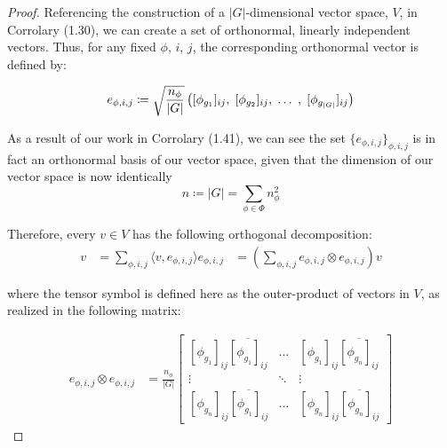 \noindent \begin{proof} Referencing the construction of a $|G|$-dimensional vector space, $V$, in Corrolary (1.30), we can create a set of orthonormal, linearly independent vectors. Thus, for any fixed $\phi$, $i$, $j$, the corresponding orthonormal vector is defined by:

\begin{equation}
	\begin{aligned}
		e_{\phi,i,j} \coloneq \sqrt{\frac{n_\phi}{|G|}}\left([\phi_{g_1}]_{ij},\hspace{1mm} [\phi_{g_2}]_{ij}, \hspace{1mm}\hdots \hspace{1mm},\hspace{1mm} [\phi_{g_{|G|}}]_{ij}\right)
	\end{aligned}
\end{equation}

As a result of our work in Corrolary (1.41), we can see the set $\{e_{\phi,i,j}\}_{\phi,i,j}$ is in fact an orthonormal basis of our vector space, given that the dimension of our vector space is now identically 
$$n \coloneq |G| = \sum_{\phi\in \Phi} n_\phi^2$$

Therefore, every $v\in V$ has the following orthogonal decomposition:
\begin{equation}
	\begin{aligned}
		v &= \sum_{\phi,i,j} \langle v , e_{\phi,i,j} \rangle e_{\phi,i,j} &= \left(\sum_{\phi,i,j} e_{\phi,i,j} \otimes e_{\phi,i,j}\right) v
	\end{aligned}
\end{equation}

where the tensor symbol is defined here as the outer-product of vectors in $V$, as realized in the following matrix:

\begin{equation}
	\begin{aligned}
		e_{\phi,i,j} \otimes e_{\phi,i,j} &= \frac{n_\phi}{|G|}\begin{bmatrix}
			[\phi_{g_1}]_{ij}\overline{[\phi_{g_1}]_{ij}} & \hdots & [\phi_{g_1}]_{ij}\overline{[\phi_{g_n}]_{ij}}\\
			\vdots & \ddots & \vdots\\
			[\phi_{g_n}]_{ij}\overline{[\phi_{g_1}]_{ij}} & \hdots & [\phi_{g_n}]_{ij}\overline{[\phi_{g_n}]_{ij}}
		\end{bmatrix}
	\end{aligned}
\end{equation}


\end{proof}
